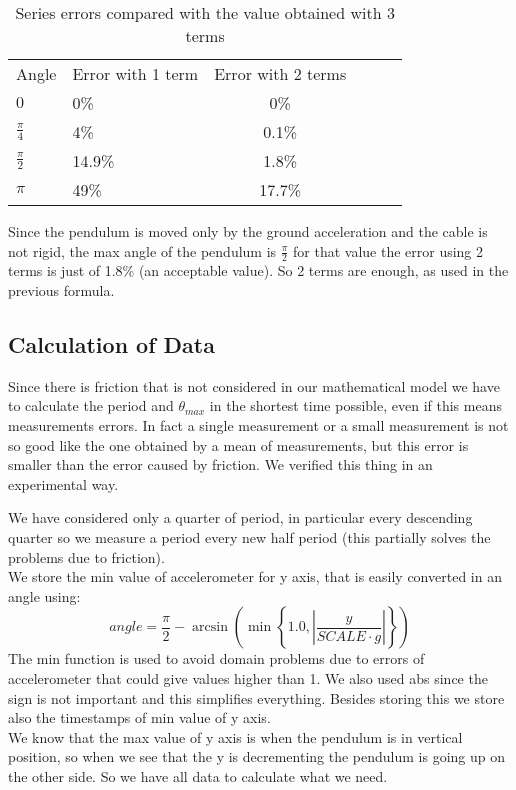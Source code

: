 \begin{table}[H]
	\small
	\begin{center}
		
		\caption{Series errors compared with the value obtained with 3 terms}
		\begin{tabular}{l|lcc|L{2cm}l}
			Angle & Error with 1 term & Error with 2 terms\\
			$0$ & 0\% & 0\%\\			
			$\frac{\pi}{4}$ & 4\% & 0.1\%\\			
			$\frac{\pi}{2}$ & 14.9\% & 1.8\%\\			
			$\pi$ & 49\% & 17.7\%\\			
		\end{tabular}
		\label{tab:errors}
	\end{center}
\end{table}

Since the pendulum is moved only by the ground acceleration and the cable is not rigid, the max angle of the pendulum is $\frac{\pi}{2}$ for that value the error using 2 terms is just of 1.8\% (an acceptable value). So 2 terms are enough, as used in the previous formula.

\subsection{Calculation of Data}
\label{sec:datacalc}

Since there is friction that is not considered in our mathematical model we have to calculate the period and $\theta_{max}$ in the shortest time possible, even if this means measurements errors. In fact a single measurement or a small measurement is not so good like the one obtained by a mean of measurements, but this error is smaller than the error caused by friction. We verified this thing in an experimental way.\par

We have considered only a quarter of period, in particular every descending quarter so we measure a period every new half period (this partially solves the problems due to friction).\\
We store the min value of accelerometer for y axis, that is easily converted in an angle using:
$$angle = \frac{\pi}{2} -\arcsin\left(\min\left\lbrace1.0, \left|\frac{y}{SCALE \cdot g}\right|\right\rbrace\right)$$
The min function is used to avoid domain problems due to errors of accelerometer that could give values higher than 1. We also used abs since the sign is not important and this simplifies everything.
Besides storing this we store also the timestamps of min value of y axis.\\
We know that the max value of y axis is when the pendulum is in vertical position, so when we see that the y is decrementing the pendulum is going up on the other side. So we have all data to calculate what we need.\par

